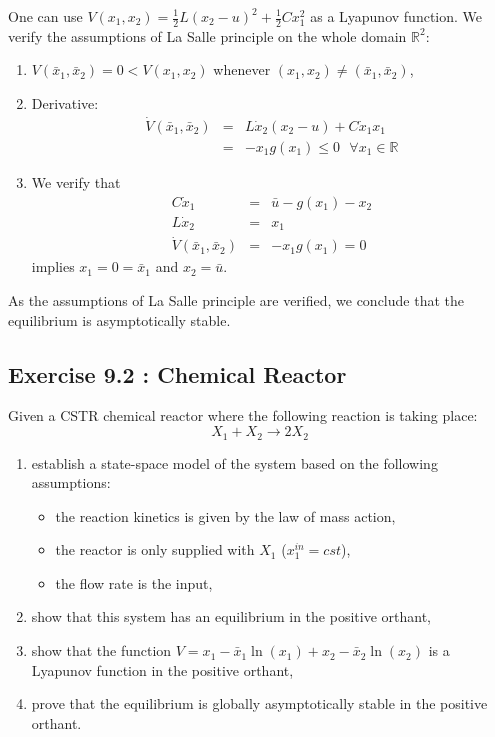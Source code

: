 One can use $V(x_1,x_2)=\frac{1}{2}L(x_2-u)^2+\frac{1}{2}Cx_1^2$ as a Lyapunov function. We verify the assumptions of La Salle principle on the whole domain $\mathbb{R}^2$:
\begin{enumerate}
\item $V(\bar{x}_1,\bar{x}_2)=0<V(x_1,x_2)$ whenever $(x_1,x_2)\neq (\bar{x}_1,\bar{x}_2)$,
\item Derivative:
$$
\begin{array}{rcl}
\dot{V}(\bar{x}_1,\bar{x}_2)&=& L\dot{x}_2(x_2-u)+C\dot{x}_1x_1\\
&=& -x_1g(x_1)\leq 0\text{ }\forall x_1\in\mathbb{R}
\end{array}
$$

\item We verify that
$$
\begin{array}{rcl}
C\dot{x}_1&=&\bar{u}-g(x_1)-x_2\\
L\dot{x}_2&=&x_1\\
\dot{V}(\bar{x}_1,\bar{x}_2) &=& -x_1g(x_1)=0
\end{array}
$$
implies $x_1=0=\bar{x}_1$ and $x_2=\bar{u}$.
\end{enumerate}
As the assumptions of La Salle principle are verified, we conclude that the equilibrium is asymptotically stable.

\subsection*{Exercise 9.2 : Chemical Reactor}

Given a CSTR chemical reactor where the following reaction is taking place:
$$
X_1 + X_2 \rightarrow 2X_2
$$
\begin{enumerate}
\item establish a state-space model of the system based on the following assumptions:
\begin{itemize}
\item the reaction kinetics is given by the law of mass action,
\item the reactor is only supplied with $X_1$ ($x_1^{in}=cst$),
\item the flow rate is the input,
\end{itemize}

\item show that this system has an equilibrium in the positive orthant,
\item show that the function $V=x_1-\bar{x}_1\ln(x_1)+x_2-\bar{x}_2\ln(x_2)$ is a Lyapunov function in the positive orthant,
\item prove that the equilibrium is globally asymptotically stable in the positive orthant.
\end{enumerate}

